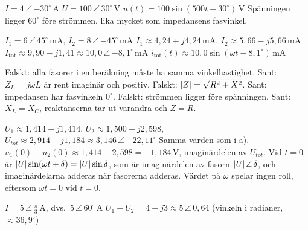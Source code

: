 \begin{facit}
  $I = 4\,\angle\,{-30^{\circ}}\,\text{A}$
 $U = 100\,\angle\,30^{\circ}\,\text{V}$
 $u(t) = 100\sin(500t + 30^{\circ})\,\text{V}$
 Spänningen ligger $60^{\circ}$ före strömmen, lika mycket som impedansens fasvinkel.

  $I_1 = 6\,\angle\,45^{\circ}\,\text{mA}$, $I_2 = 8\,\angle\,{-45^{\circ}}\,
\text{mA}$
 $I_1 \approx 4{,}24 + j4{,}24\,\text{mA}$, $I_2 \approx 5{,}66 - j5{,}66\,\text{mA}$
 $I_{\text{tot}} \approx 9{,}90 - j1{,}41 \approx 10{,}0\,\angle\,{-8{,}1^{\circ}}\,
\text{mA}$
 $i_{\text{tot}}(t) \approx 10{,}0\sin(\omega t - 8{,}1^{\circ})\,\text{mA}$

  Falskt: alla fasorer i en beräkning måste ha samma vinkelhastighet.
 Sant: $Z_L = j\omega L$ är rent imaginär och positiv.
 Falskt: $\lvert Z\rvert = \sqrt{R^2 + X^2}$.
 Sant: impedansen har fasvinkeln $0^{\circ}$.
 Falskt: strömmen ligger före spänningen.
 Sant: $X_L = X_C$, reaktanserna tar ut varandra och $Z = R$.

  $U_1 \approx 1{,}414 + j1{,}414$, $U_2 \approx 1{,}500 - j2{,}598$,
$U_{tot} \approx 2{,}914 - j1{,}184 \approx 3{,}146\,\angle\,{-22{,}11^{\circ}}$
 Samma värden som i a).
 $u_1(0) + u_2(0) \approx 1{,}414 - 2{,}598 = -1{,}184\,\text{V}$, imaginärdelen av $U_{tot}$.
Vid $t = 0$ är $\lvert U\rvert\sin(\omega t + \delta) = \lvert U\rvert\sin\delta$, som är imaginärdelen av fasorn
$\lvert U\rvert\,\angle\,\delta$, och imaginärdelarna adderas när fasorerna adderas.
Värdet på $\omega$ spelar ingen roll, eftersom $\omega t = 0$ vid $t = 0$.

  $I = 5\,\angle\,\frac{\pi}{3}\,\text{A}$, dvs.\
$5\,\angle\,60^{\circ}\,\text{A}$
 $U_1 + U_2 = 4 + j3 \approx 5\,\angle\,0{,}64$ (vinkeln i radianer, $\approx 36{,}9^{\circ}$)

\end{facit}
